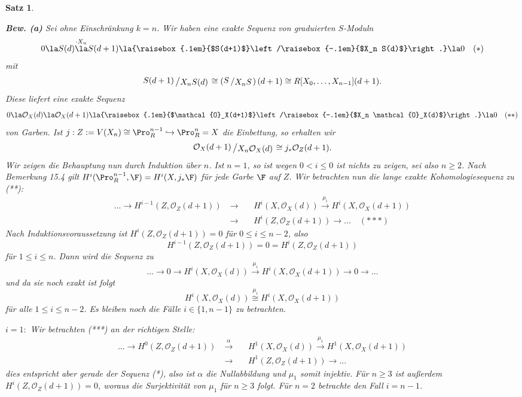 \documentclass[11pt]{book}
\newtheorem{theorem}{Satz}[section]
\theoremstyle{nonumberbreak}
\newenvironment{pr}[1][]{\ifthenelse{\equal{#1}{}}{\proof}{\proof[#1]}\rm}{\endproof}
\newcommand{\slant}[2]{{\raisebox{.1em}{$#1$}\left/\raisebox{-.1em}{$#2$}\right.}}
\begin{document}
\begin{spacing}{1.4}
\begin{theorem}
\begin{pr}
\begin{compactenum}
\begin{compactenum}
\item[\textbf{Bew. (a)}] Sei ohne Einschränkung $k=n$. Wir haben eine exakte Sequenz von graduierten $S$-Moduln
$$0 \la S(d) \overset{\cdot X_n}{\la} S(d+1) \la \slant{S(d+1)}{X_n S(d)} \la 0 \quad (*)$$
mit $$\slant{S(d+1)}{X_n S(d)} \cong \left( \slant{S}{X_n S}\right)(d+1) \cong R[X_0, \ldots, X_{n-1}] (d+1).$$
Diese liefert eine exakte Sequenz
$$0 \la \mathcal{O}_X(d) \la \mathcal{O}_X(d+1) \la \slant{\mathcal{O}_X(d+1)}{X_n \mathcal{O}_X(d)} \la 0 \quad (**)$$
von Garben. Ist $j: Z:=V(X_n) \cong \Pro^{n-1}_R \hookrightarrow \Pro^n_R=X$ die Einbettung, so erhalten wir 
$$\slant{\mathcal{O}_X(d+1)}{X_n \mathcal{O}_X(d)} \cong j_* \mathcal{O}_{Z}(d+1).$$
Wir zeigen die Behauptung nun durch Induktion über $n$. Ist $n=1$, so ist wegen $0 < i \leqslant 0$ ist nichts zu zeigen, sei also $n \geqslant 2$. Nach Bemerkung 15.4 gilt $H^{i}(\Pro^{n-1}_R, \F) = H^{i}(X, j_*\F)$ für jede Garbe $\F$ auf $Z$. Wir betrachten nun die lange exakte Kohomologiesequenz zu (**):
\setlength{\abovedisplayskip}{5.5pt}
\setlength{\belowdisplayskip}{5.5pt}
\begin{alignat*}{5}
\ldots \rightarrow H^{i-1}(Z, \mathcal{O}_{Z}(d+1)) \ &\rightarrow&& \  H^{i}(X, \mathcal{O}_X(d)) \overset{\mu_i}{\rightarrow} H^{i}(X, \mathcal{O}_X(d+1))\\
& \rightarrow&& \ H^{i}(Z, \mathcal{O}_{Z}(d+1)) \rightarrow \ldots \quad (***)
\end{alignat*}
Nach Induktionsvoraussetzung ist $H^{i}(Z, \mathcal{O}_{Z}(d+1)) = 0$ für $0 \leqslant i \leqslant n-2$, also 
$$H^{i-1}(Z, \mathcal{O}_{Z}(d+1)) = 0 = H^{i}(Z, \mathcal{O}_{Z}(d+1))$$
für $1 \leqslant i \leqslant n$. Dann wird die Sequenz zu
$$\ldots \rightarrow 0 \rightarrow H^{i}(X, \mathcal{O}_X(d))\overset{\mu_i}{\rightarrow} H^{i}(X, \mathcal{O}_X(d+1)) \rightarrow 0 \rightarrow \ldots $$
und da sie noch exakt ist folgt 
$$H^{i}(X, \mathcal{O}_X(d)) \overset{\mu_i}{\cong} H^{i}(X, \mathcal{O}_X(d+1)) $$
für alle $1 \leqslant i \leqslant n-2$. Es bleiben noch die Fälle $i \in \{1, n-1\}$ zu betrachten.
\begin{compactenum}
\item[$i=1:$] Wir betrachten (***) an der richtigen Stelle:
\setlength{\abovedisplayskip}{5.5pt}
\setlength{\belowdisplayskip}{5.5pt}
\begin{alignat*}{5}
\ldots \rightarrow H^{0}(Z, \mathcal{O}_{Z}(d+1)) \ &\overset{\alpha}{\rightarrow} && \  H^{1}(X, \mathcal{O}_X(d)) \overset{\mu_1}{\rightarrow} H^{1}(X, \mathcal{O}_X(d+1))\\
& \rightarrow&& \ H^{1}(Z, \mathcal{O}_{Z}(d+1)) \rightarrow \ldots
\end{alignat*}
dies entspricht aber gerade der Sequenz (*), also ist $\alpha$ die Nullabbildung und $\mu_1$ somit injektiv. Für $n \geqslant 3$ ist außerdem $H^{i}(Z, \mathcal{O}_{Z}(d+1)) =0$, woraus die Surjektivität von $\mu_1$ für $n \geqslant 3$ folgt. Für $n=2$ betrachte den Fall $i=n-1$.


\end{compactenum}
\end{compactenum}
\end{compactenum}
\end{pr}
\end{theorem}
\end{spacing}
\end{document}
